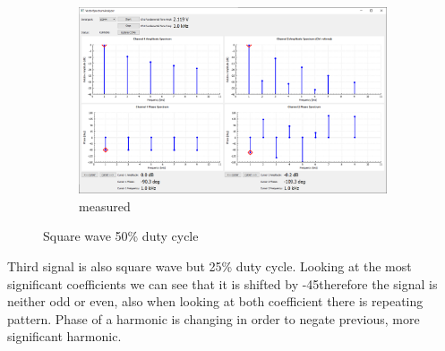 \documentclass[notitlepage, a4paper, 11pt]{article}
\begin{document}
\begin{figure}[H]
\begin{subfigure}[][][t]{0.3\textwidth}
			\includegraphics[width=\textwidth, trim=10 80 555 100, clip]{../img/Circuit1/dut50}
			\caption{measured}
			\label{fig:meas-signal-b}
		\end{subfigure}
		\caption{Square wave 50\% duty cycle}
		\label{fig:pure-sqr50}
	\end{figure}
	
	Third signal is also square wave but 25\% duty cycle. Looking at the most significant coefficients we can see that it is shifted by -45\degree therefore the signal is neither odd or even, also when looking at both coefficient there is repeating pattern. Phase of a harmonic is changing in order to negate previous, more significant harmonic.
	
\end{document}
